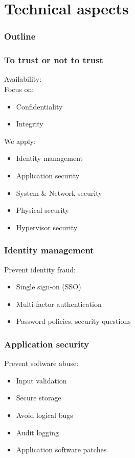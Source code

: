 \documentclass{beamer}
\begin{document}
\section{Technical aspects}

\begin{frame}
  \frametitle{Outline}
\end{frame}

\begin{frame}
    \frametitle{To trust or not to trust}

    Availability: \checkmark \\
    Focus on:
    \begin{itemize}
      \item Confidentiality
      \item Integrity
    \end{itemize}
    We apply:
    \begin{itemize} %
      \item Identity management
      \item Application security
      \item System \& Network security
      \item Physical security
      \item Hypervisor security %
    \end{itemize}
\end{frame}

\begin{frame}
    \frametitle{Identity management}
    Prevent identity fraud:
    \begin{itemize}
      \item Single sign-on (SSO) %
      \item Multi-factor authentication
      \item Password policies, security questions
    \end{itemize}
\end{frame}

\begin{frame}
    \frametitle{Application security}
    Prevent software abuse:
    \begin{itemize}
      \item Input validation
      \item Secure storage
      \item Avoid logical bugs
      \item Audit logging
      \item Application software patches
    \end{itemize}
\end{frame}
\end{document}
